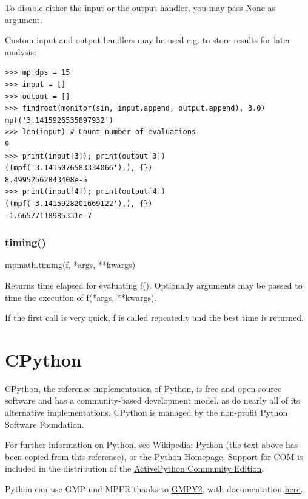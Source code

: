 To disable either the input or the output handler, you may pass None as argument.

\vpara
Custom input and output handlers may be used e.g. to store results for later analysis:

\begin{lstlisting}
>>> mp.dps = 15
>>> input = []
>>> output = []
>>> findroot(monitor(sin, input.append, output.append), 3.0)
mpf('3.1415926535897932')
>>> len(input) # Count number of evaluations
9
>>> print(input[3]); print(output[3])
((mpf('3.1415076583334066'),), {})
8.49952562843408e-5
>>> print(input[4]); print(output[4])
((mpf('3.1415928201669122'),), {})
-1.66577118985331e-7
\end{lstlisting}

\subsubsection{timing()}

mpmath.timing(f, *args, **kwargs)

\vpara
Returns time elapsed for evaluating f(). Optionally arguments may be passed to time the execution of f(*args, **kwargs).

\vpara
If the first call is very quick, f is called repeatedly and the best time is returned.




\newpage
\section{CPython}

CPython, the reference implementation of Python, is free and open source software and has a community-based development model, as do nearly all of its alternative implementations. CPython is managed by the non-profit Python Software Foundation.

\vpara
For further information on Python, see \href{http://en.wikipedia.org/wiki/Python_(programming_language)}{Wikipedia: Python} (the text above has been copied from this reference), or the  \href{http://www.python.org/}{Python Homepage}. Support for COM is included in the distribution of the \href{http://www.activestate.com/activepython/downloads}{ActivePython Community Edition}.

\vpara
Python can use  GMP und MPFR thanks to \href{http://code.google.com/p/gmpy/}{GMPY2}, with documentation \href{https://gmpy2.readthedocs.org/en/latest/}{here}.


